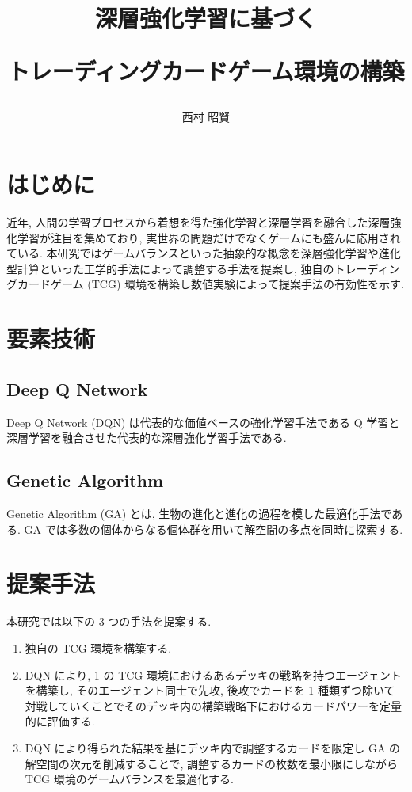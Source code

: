 \documentclass[a4paper,twoside,twocolumn,10pt]{article}
\title{深層強化学習に基づく
\par
トレーディングカードゲーム環境の構築}
\author{西村 昭賢}
\begin{document}
\maketitle %
\small

\section{はじめに}
近年, 人間の学習プロセスから着想を得た強化学習と深層学習を融合した深層強化学習が注目を集めており, 実世界の問題だけでなくゲームにも盛んに応用されている.
本研究ではゲームバランスといった抽象的な概念を深層強化学習や進化型計算といった工学的手法によって調整する手法を提案し, 独自のトレーディングカードゲーム (TCG) 環境を構築し数値実験によって提案手法の有効性を示す.

\section{要素技術}
\subsection{Deep Q Network}
Deep Q Network (DQN) \cite{DQN} は代表的な価値ベースの強化学習手法である Q 学習と深層学習を融合させた代表的な深層強化学習手法である.

\subsection{Genetic Algorithm}
Genetic Algorithm (GA) とは, 生物の進化と進化の過程を模した最適化手法である. GA では多数の個体からなる個体群を用いて解空間の多点を同時に探索する.
\section{提案手法}
本研究では以下の 3 つの手法を提案する.
\begin{enumerate}
  \setlength{\itemsep}{0cm} %
  \item 独自の TCG 環境を構築する.
  \item DQN により, 1 の TCG 環境におけるあるデッキの戦略を持つエージェントを構築し, そのエージェント同士で先攻, 後攻でカードを 1 種類ずつ除いて対戦していくことでそのデッキ内の構築戦略下におけるカードパワーを定量的に評価する.
  \item DQN により得られた結果を基にデッキ内で調整するカードを限定し GA の解空間の次元を削減することで, 調整するカードの枚数を最小限にしながら TCG 環境のゲームバランスを最適化する.
\end{enumerate}
\end{document}
